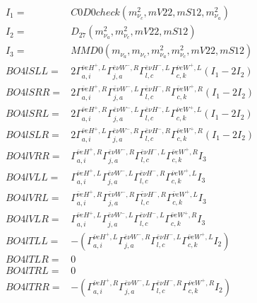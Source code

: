 \documentclass[A4,landscape]{article}
\begin{document}
\begin{align} 
I_1 = & C0D0check(m^2_{\nu_{{c}}}, mV22, mS12, m^2_{\nu_{{a}}}) \\ 
I_2 = & D_{27}(m^2_{\nu_{{a}}}, m^2_{\nu_{{c}}}, mV22, mS12) \\ 
I_3 = & MMD0(m_{\nu_{{a}}}, m_{\nu_{{c}}}, m^2_{\nu_{{a}}}, m^2_{\nu_{{c}}}, mV22, mS12) \\ 
  BO4lSLL= & 2  \Gamma^{\bar{\nu}e H^+ ,L}_{a, i} \Gamma^{\bar{e}\nu W^-,R}_{j, a} \Gamma^{\bar{e}\nu H^-,L}_{l, c} \Gamma^{\bar{\nu}e W^+ ,L}_{c, k} (I_1 - 2 I_2) \\ 
  BO4lSRR= & 2  \Gamma^{\bar{\nu}e H^+ ,R}_{a, i} \Gamma^{\bar{e}\nu W^-,L}_{j, a} \Gamma^{\bar{e}\nu H^-,R}_{l, c} \Gamma^{\bar{\nu}e W^+ ,R}_{c, k} (I_1 - 2 I_2) \\ 
  BO4lSRL= & 2  \Gamma^{\bar{\nu}e H^+ ,R}_{a, i} \Gamma^{\bar{e}\nu W^-,L}_{j, a} \Gamma^{\bar{e}\nu H^-,L}_{l, c} \Gamma^{\bar{\nu}e W^+ ,L}_{c, k} (I_1 - 2 I_2) \\ 
  BO4lSLR= & 2  \Gamma^{\bar{\nu}e H^+ ,L}_{a, i} \Gamma^{\bar{e}\nu W^-,R}_{j, a} \Gamma^{\bar{e}\nu H^-,R}_{l, c} \Gamma^{\bar{\nu}e W^+ ,R}_{c, k} (I_1 - 2 I_2) \\ 
  BO4lVRR= &  \Gamma^{\bar{\nu}e H^+ ,R}_{a, i} \Gamma^{\bar{e}\nu W^-,R}_{j, a} \Gamma^{\bar{e}\nu H^-,L}_{l, c} \Gamma^{\bar{\nu}e W^+ ,R}_{c, k} I_3 \\ 
  BO4lVLL= &  \Gamma^{\bar{\nu}e H^+ ,L}_{a, i} \Gamma^{\bar{e}\nu W^-,L}_{j, a} \Gamma^{\bar{e}\nu H^-,R}_{l, c} \Gamma^{\bar{\nu}e W^+ ,L}_{c, k} I_3 \\ 
  BO4lVRL= &  \Gamma^{\bar{\nu}e H^+ ,R}_{a, i} \Gamma^{\bar{e}\nu W^-,R}_{j, a} \Gamma^{\bar{e}\nu H^-,R}_{l, c} \Gamma^{\bar{\nu}e W^+ ,L}_{c, k} I_3 \\ 
  BO4lVLR= &  \Gamma^{\bar{\nu}e H^+ ,L}_{a, i} \Gamma^{\bar{e}\nu W^-,L}_{j, a} \Gamma^{\bar{e}\nu H^-,L}_{l, c} \Gamma^{\bar{\nu}e W^+ ,R}_{c, k} I_3 \\ 
  BO4lTLL= & -( \Gamma^{\bar{\nu}e H^+ ,L}_{a, i} \Gamma^{\bar{e}\nu W^-,R}_{j, a} \Gamma^{\bar{e}\nu H^-,L}_{l, c} \Gamma^{\bar{\nu}e W^+ ,L}_{c, k} I_2) \\ 
  BO4lTLR= & 0 \\ 
  BO4lTRL= & 0 \\ 
  BO4lTRR= & -( \Gamma^{\bar{\nu}e H^+ ,R}_{a, i} \Gamma^{\bar{e}\nu W^-,L}_{j, a} \Gamma^{\bar{e}\nu H^-,R}_{l, c} \Gamma^{\bar{\nu}e W^+ ,R}_{c, k} I_2) \\ 
\end{align} 
\end{document}

